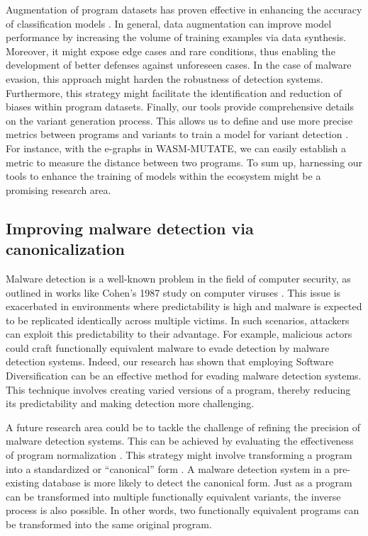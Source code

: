 Augmentation of program datasets has proven effective in enhancing the accuracy of classification models \cite{2021arXiv210311882S, selfAPR, 10.1109/TSE.2023.3240118}.
In general, data augmentation can improve model performance by increasing the volume of training examples via data synthesis.
Moreover, it might expose edge cases and rare conditions, thus enabling the development of better defenses against unforeseen cases.
In the case of malware evasion, this approach might harden the robustness of detection systems.
Furthermore, this strategy might facilitate the identification and reduction of biases within \Wasm program datasets. 
Finally, our tools provide comprehensive details on the variant generation process. 
This allows us to define and use more precise metrics between programs and variants to train a model for variant detection \cite{li2023rethinking}. 
For instance, with the e-graphs in WASM-MUTATE, we can easily establish a metric to measure the distance between two programs. 
To sum up, harnessing our tools to enhance the training of models within the \Wasm ecosystem might be a promising research area. 


\vspace{-0.3cm}
\subsection{Improving \Wasm malware detection via canonicalization}

Malware detection is a well-known problem in the field of computer security, as outlined in works like Cohen's 1987 study on computer viruses \cite{cohen1987computer}. 
This issue is exacerbated in environments where predictability is high and malware is expected to be replicated identically across multiple victims. 
In such scenarios, attackers can exploit this predictability to their advantage. 
For example, malicious actors could craft functionally equivalent malware to evade detection by malware detection systems.
Indeed, our research has shown that employing Software Diversification can be an effective method for evading malware detection systems. 
This technique involves creating varied versions of a program, thereby reducing its predictability and making detection more challenging. 


A future research area could be to tackle the challenge of refining the precision of malware detection systems. 
This can be achieved by evaluating the effectiveness of program normalization \cite{seideman2023transformation}. 
This strategy might involve transforming a program into a standardized or ``canonical'' form \cite{Huang2017BinSequenceFA}.
A malware detection system in a pre-existing database is more likely to detect the canonical form.
Just as a program can be transformed into multiple functionally equivalent variants, the inverse process is also possible. 
In other words, two functionally equivalent programs can be transformed into the same original program. 


